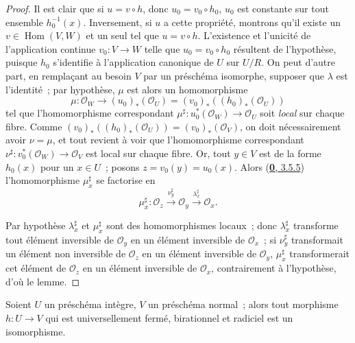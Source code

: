 \begin{proof}
Il est clair que si $u=v\circ h$, donc $u_0=v_0\circ h_0$, $u_0$ est
constante sur tout ensemble $h_0^{-1}(x)$. Inversement, si $u$ a cette
propriété, montrons qu'il existe un $v\in\operatorname{Hom}(V,W)$ et un seul
tel que $u=v\circ h$. L'existence et l'unicité de l'application continue
$v_0:V\to W$ telle que $u_0=v_0\circ h_0$ résultent de l'hypothèse, puisque
$h_0$ s'identifie à l'application canonique de $U$ sur $U/R$. On peut d'autre
part, en remplaçant au besoin $V$ par un préschéma isomorphe, supposer que
$\lambda$ est l'identité~; par hypothèse, $\mu$ est alors un homomorphisme
\[
  \mu:\mathcal{O}_W\longrightarrow(u_0)_*(\mathcal{O}_U)
  =(v_0)_*((h_0)_*(\mathcal{O}_U))
\]
tel que l'homomorphisme correspondant
$\mu^\sharp:u_0^*(\mathcal{O}_W)\to\mathcal{O}_U$ soit \emph{local} sur chaque
fibre. Comme
$(v_0)_*((h_0)_*(\mathcal{O}_U))=(v_0)_*(\mathcal{O}_V)$, on doit
nécessairement avoir $\nu=\mu$, et tout revient à voir que l'homomorphisme
correspondant $\nu^\sharp:v_0^*(\mathcal{O}_W)\to\mathcal{O}_V$ est local sur
chaque fibre. Or, tout $y\in V$ est de la forme $h_0(x)$ pour un $x\in U$~;
posons $z=v_0(y)=u_0(x)$. Alors
(\hyperref[0.3.5.5-fr]{\textbf{0}, 3.5.5}) l'homomorphisme $\mu_x^\sharp$ se factorise
en
\[
  \mu_x^\sharp:\mathcal{O}_z
  \xrightarrow{\nu_y^\sharp}\mathcal{O}_y
  \xrightarrow{\lambda_x^\sharp}\mathcal{O}_x.
\]

Par hypothèse $\lambda_x^\sharp$ et $\mu_x^\sharp$ sont des homomorphismes
locaux~; donc $\lambda_x^\sharp$ transforme tout élément inversible de
$\mathcal{O}_y$ en un élément inversible de $\mathcal{O}_x$~; si
$\nu_y^\sharp$ transformait un élément non inversible de $\mathcal{O}_z$ en
un élément inversible de $\mathcal{O}_y$, $\mu_x^\sharp$ transformerait cet
élément de $\mathcal{O}_z$ en un élément inversible de $\mathcal{O}_x$,
contrairement à l'hypothèse, d'où le lemme.
\end{proof}

\begin{corollary}[8.11.2]
\label{II.8.11.2-fr}
Soient $U$ un préschéma intègre, $V$ un préschéma normal~; alors tout morphisme
$h:U\to V$ qui est universellement fermé, birationnel et radiciel est un
isomorphisme.
\end{corollary}

